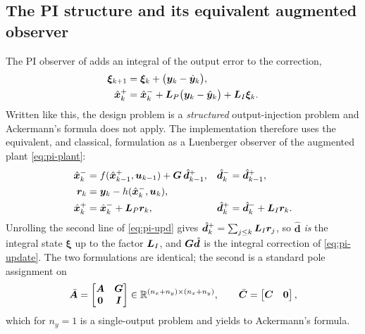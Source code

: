 \subsection{The PI structure and its equivalent augmented observer}
The PI observer of \cite{wojciechowski1978,beale1989pi} adds an integral of the output error to
the correction,
\begin{align}
\bm{\xi}_{k+1} &= \bm{\xi}_k + \big(\bm{y}_k - \hat{\bm{y}}_k\big) , \label{eq:pi-xi}\\
\hat{\bm{x}}^{+}_k &= \hat{\bm{x}}^{-}_k + \bm{L}_P\big(\bm{y}_k-\hat{\bm{y}}_k\big) + \bm{L}_I\bm{\xi}_k .\label{eq:pi-update}
\end{align}
Written like this, the design problem is a \emph{structured} output-injection problem and
Ackermann's formula does not apply.  The implementation therefore uses the equivalent, and
classical, formulation as a Luenberger observer of the augmented plant \eqref{eq:pi-plant}:
\begin{align}
\hat{\bm{x}}^{-}_k &= f(\hat{\bm{x}}^{+}_{k-1},\bm{u}_{k-1}) + \bm{G}\,\hat{\bm{d}}^+_{k-1} , &
\hat{\bm{d}}^-_k &= \hat{\bm{d}}^+_{k-1} , \label{eq:pi-pred}\\
\bm{r}_k &= \bm{y}_k - h(\hat{\bm{x}}^{-}_k,\bm{u}_k) , & & \label{eq:pi-res}\\
\hat{\bm{x}}^{+}_k &= \hat{\bm{x}}^{-}_k + \bm{L}_P\bm{r}_k , &
\hat{\bm{d}}^+_k &= \hat{\bm{d}}^-_k + \bm{L}_I\bm{r}_k . \label{eq:pi-upd}
\end{align}
Unrolling the second line of \eqref{eq:pi-upd} gives
$\hat{\bm{d}}^+_k = \sum_{j\le k}\bm{L}_I\bm{r}_j$, so $\hat{\bm{d}}$ \emph{is} the integral state
$\bm{\xi}$ up to the factor $\bm{L}_I$, and $\bm{G}\hat{\bm{d}}$ is the integral correction of
\eqref{eq:pi-update}.  The two formulations are identical; the second is a standard pole
assignment on
\begin{equation}
\bar{\bm{A}} = \begin{bmatrix}\bm{A} & \bm{G}\\ \bm{0} & \bm{I}\end{bmatrix}\in\mathbb{R}^{(n_x+n_y)\times(n_x+n_y)} ,
\qquad
\bar{\bm{C}} = \begin{bmatrix}\bm{C} & \bm{0}\end{bmatrix} ,
\label{eq:pi-aug}
\end{equation}
which for $n_y = 1$ is a single-output problem and yields to Ackermann's formula.

